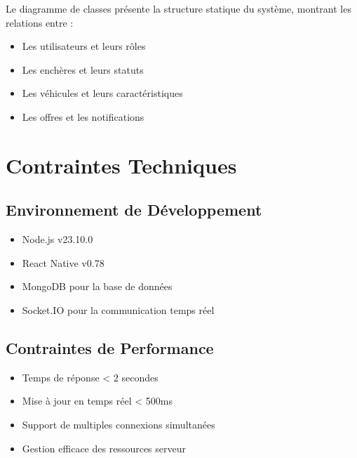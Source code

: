 Le diagramme de classes présente la structure statique du système, montrant les relations entre :
\begin{itemize}
    \item Les utilisateurs et leurs rôles
    \item Les enchères et leurs statuts
    \item Les véhicules et leurs caractéristiques
    \item Les offres et les notifications
\end{itemize}

\section{Contraintes Techniques}
\subsection{Environnement de Développement}
\begin{itemize}
    \item Node.js v23.10.0
    \item React Native v0.78
    \item MongoDB pour la base de données
    \item Socket.IO pour la communication temps réel
\end{itemize}

\subsection{Contraintes de Performance}
\begin{itemize}
    \item Temps de réponse < 2 secondes
    \item Mise à jour en temps réel < 500ms
    \item Support de multiples connexions simultanées
    \item Gestion efficace des ressources serveur
\end{itemize} 